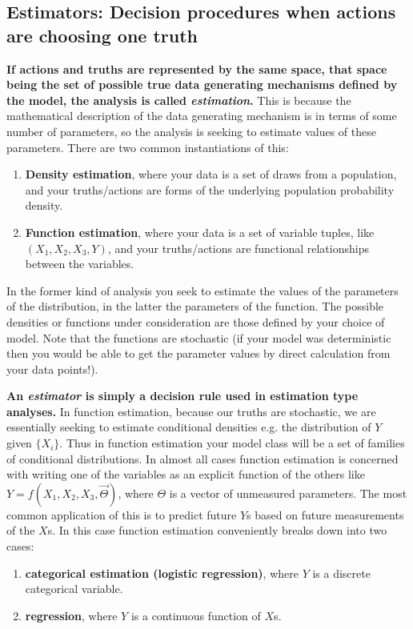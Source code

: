 \subsection{Estimators: Decision procedures when actions are choosing one truth}
\textbf{If actions and  truths are represented by the same space, that space being the set of possible true data generating mechanisms defined by the model, the analysis is called \emph{estimation}.}  This is because the mathematical description of the data generating mechanism is in terms of some number of parameters, so the analysis is seeking to estimate values of these parameters. There are two common instantiations of this:
\begin{enumerate}
\item \textbf{Density estimation}, where your data is a set of draws from a population, and your truths/actions are forms of the underlying population probability density.
\item \textbf{Function estimation}, where your data is a set of variable tuples, like $(X_1, X_2, X_3, Y)$, and your truths/actions are functional relationships between the variables.
\end{enumerate}

In the former kind of analysis you seek to estimate the values of the parameters of the distribution, in the latter the parameters of the function. The possible densities or functions under consideration are those defined by your choice of model. Note that the functions are stochastic (if your model was deterministic then you would be able to get the parameter values by direct calculation from your data points!). 
\newline

\textbf{ An \emph{estimator} is simply a decision rule used in estimation type analyses.} In function estimation, because our truths are stochastic, we are essentially seeking to estimate conditional densities e.g. the distribution of $Y$ given $\{X_i\}$. Thus in function estimation your model class will be a set of families of conditional distributions. In almost all cases function estimation is concerned with writing one of the variables as an explicit function of the others like $Y = f(X_1, X_2, X_3, \vec{\Theta})$, where $\Theta$ is a vector of unmeasured parameters. The most common application of this is to predict future $Y$s based on future measurements of the $X$s. In this case function estimation conveniently breaks down into two cases: 
\begin{enumerate}
\item \textbf{categorical estimation (logistic regression)}, where $Y$ is a discrete categorical variable.
\item \textbf{regression}, where $Y$ is a continuous function of $X$s.
\end{enumerate}

